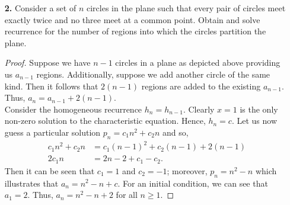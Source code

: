 \documentclass[ 12pt ]{article}
\begin{document}
\begin{enumerate}
\begin{proof}
\begin{enumerate}
				\item[\textbf{ii.}] Suppose $A(x) = \sum_{n \geq 0} a_n x^n$ where $x$ lies in an arbitrarily small interval about the origin. Let us now apply $\sum_{n \geq 2} x^n$
					to our recurrence,
					\begin{align*}
						\sum_{n \geq 2} a_n x^n &= 3 \sum_{n \geq 2} a_{n-1} x^n - 2 \sum_{n \geq 2} a_{n-2} x^n + \sum_{n \geq 2} x^n \\
						A(x) - 4x - 2 &= 3x(A(x) - 2) -2x^2A(x) + \frac{x^2}{1 - x} \\
						A(x) &= \frac{3x^2 - 4x + 2}{(1-x)^2(1-2x)} \\
						A(x) &= \frac{3}{1-2x} - \frac{1}{(1-x)^2}
					\end{align*}
					Then applying the coefficient operator, we have
					\begin{align*}
						[x^n]A(x) &= [x^n] \frac{3}{1-2x} - [x^n] \frac{1}{(1-x)^2} \\
						a_n &= 3 \cdot 2^n - n - 1.
					\end{align*}
			\end{enumerate}
		\end{proof}


	\item[\textbf{2.}] Consider a set of $n$ circles in the plane such that every pair of circles meet exactly twice and no three meet at a common point. Obtain and solve recurrence
		for the number of regions into which the circles partition the plane.

		\begin{proof}
			Suppose we have $n-1$ circles in a plane as depicted above providing us $a_{n-1}$ regions. Additionally, suppose we add another circle of the same kind. Then it follows
			that $2(n-1)$ regions are added to the existing $a_{n-1}$. Thus, $a_n = a_{n-1} + 2(n-1)$. \\

			Consider the homogeneous recurrence $h_n = h_{n-1}$. Clearly $x = 1$ is the only non-zero solution to the characteristic equation. Hence, $h_n = c$. Let us now guess
			a particular solution $p_n = c_1 n^2 + c_2 n$ and so,
			\begin{align*}
				c_1 n^2 + c_2 n &= c_1 (n - 1)^2 + c_2 (n - 1) + 2(n - 1) \\
				2c_1n &= 2n - 2 + c_1 - c_2.
			\end{align*}
			Then it can be seen that $c_1 = 1$ and $c_2 = -1$; moreover, $p_n = n^2 - n$ which illustrates that $a_n = n^2 - n + c$. For an initial condition, we can see that $a_1 = 2$.
			Thus, $a_n = n^2 - n + 2$ for all $n \geq 1$.
		\end{proof}



\end{enumerate}
\end{document}
